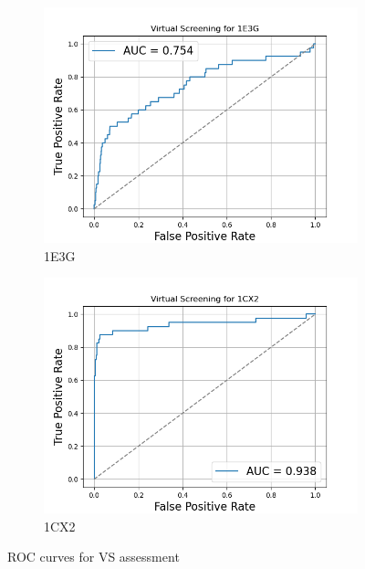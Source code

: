 \documentclass[a4paper,10pt]{article}
\begin{document}
\begin{figure}[h!]
  \vspace{1em}

  \begin{subfigure}{0.45\linewidth}
    \includegraphics[width=\linewidth]{figures/ROC_1E3G.png}
    \caption{1E3G}
    \label{fig:c}
  \end{subfigure}
  \hfill
  \begin{subfigure}{0.45\linewidth}
    \includegraphics[width=\linewidth]{figures/ROC_1CX2.png}
    \caption{1CX2}
    \label{fig:d}
  \end{subfigure}

  \caption{ROC curves for VS assessment}
  \label{fig:ROCs}
\end{figure}
\end{document}
